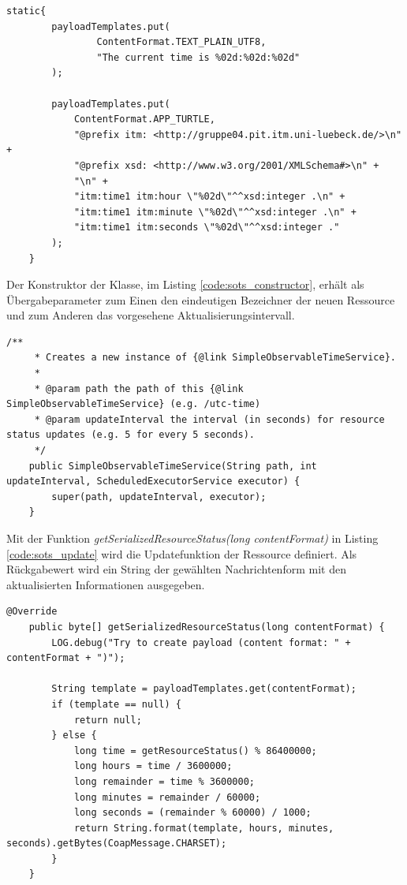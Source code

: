 \begin{lstlisting}[float=htb,caption={SimpleObservableTimeService Beschreibung der Payload},label=code:sots_ontology]
static{
        payloadTemplates.put(
                ContentFormat.TEXT_PLAIN_UTF8,
                "The current time is %02d:%02d:%02d"
        );
        
        payloadTemplates.put(
	        ContentFormat.APP_TURTLE,
	        "@prefix itm: <http://gruppe04.pit.itm.uni-luebeck.de/>\n" +
	        "@prefix xsd: <http://www.w3.org/2001/XMLSchema#>\n" +
	        "\n" + 
	        "itm:time1 itm:hour \"%02d\"^^xsd:integer .\n" + 
	       	"itm:time1 itm:minute \"%02d\"^^xsd:integer .\n" + 
	       	"itm:time1 itm:seconds \"%02d\"^^xsd:integer ."
        );        
    }
\end{lstlisting}


Der Konstruktor der Klasse, im Listing \ref{code:sots_constructor}, erhält als Übergabeparameter zum Einen den eindeutigen Bezeichner der neuen Ressource und zum Anderen das vorgesehene Aktualisierungsintervall. 

\begin{lstlisting}[float=htb,caption={Konstruktor mit Ressourcenpfad und Updateintervall},label=code:sots_constructor]
/**
     * Creates a new instance of {@link SimpleObservableTimeService}.
     *
     * @param path the path of this {@link SimpleObservableTimeService} (e.g. /utc-time)
     * @param updateInterval the interval (in seconds) for resource status updates (e.g. 5 for every 5 seconds).
     */
    public SimpleObservableTimeService(String path, int updateInterval, ScheduledExecutorService executor) {
        super(path, updateInterval, executor);
    }
\end{lstlisting}


Mit der Funktion \textit{getSerializedResourceStatus(long contentFormat)} in Listing \ref{code:sots_update} wird die Updatefunktion der Ressource definiert. Als Rückgabewert wird ein String der gewählten Nachrichtenform mit den aktualisierten Informationen ausgegeben.

\begin{lstlisting}[float=htb,caption={Updatefunktiondes Services},label=code:sots_update]
    @Override
    public byte[] getSerializedResourceStatus(long contentFormat) {
        LOG.debug("Try to create payload (content format: " + contentFormat + ")");

        String template = payloadTemplates.get(contentFormat);
        if (template == null) {
            return null;
        } else {
            long time = getResourceStatus() % 86400000;
            long hours = time / 3600000;
            long remainder = time % 3600000;
            long minutes = remainder / 60000;
            long seconds = (remainder % 60000) / 1000;
            return String.format(template, hours, minutes, seconds).getBytes(CoapMessage.CHARSET);
        }
    }
\end{lstlisting}


